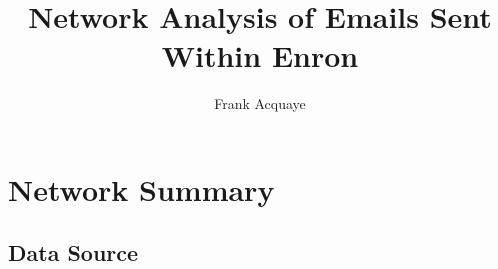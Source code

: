 \documentclass[11pt, oneside]{article}   	%
\title{Network Analysis of Emails Sent Within Enron}
\author{Frank Acquaye}
\begin{document}
	\maketitle
	
	\section{Network Summary}
	\subsection{Data Source}

	
	
	
\end{document}
